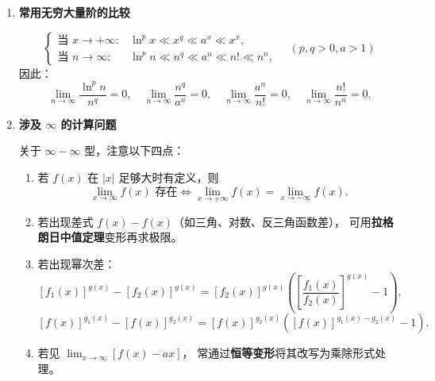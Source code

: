 \begin{enumerate}
\begin{enumerate}
              \item \textbf{带头大哥型：}

                    若 $\alpha=o(\beta)$，则
                    \[
                        \textcircled{1}\ \alpha+\beta\sim\beta, \qquad
                        \textcircled{2}\ \alpha+\beta\text{ 与 }\beta\text{同号}, \qquad
                        \textcircled{3}\ \alpha\beta=o(\beta^2).
                    \]
          \end{enumerate}

    \item \textbf{常用无穷大量阶的比较}

          \[
              \begin{cases}
                  \text{当 }x\to+\infty: & \ln^p x \ll x^q \ll a^x \ll x^x,        \\[4pt]
                  \text{当 }n\to\infty:  & \ln^p n \ll n^q \ll a^n \ll n! \ll n^n,
              \end{cases}\quad (p,q>0,a>1)
          \]
          因此：
          \[
              \lim_{n\to\infty}\frac{\ln^p n}{n^q}=0,\quad
              \lim_{n\to\infty}\frac{n^q}{a^n}=0,\quad
              \lim_{n\to\infty}\frac{a^n}{n!}=0,\quad
              \lim_{n\to\infty}\frac{n!}{n^n}=0.
          \]

    \item \textbf{涉及 $\infty$ 的计算问题} \DTwoThree

          关于 $\infty-\infty$ 型，注意以下四点：

          \begin{enumerate}
              \item 若 $f(x)$ 在 $|x|$ 足够大时有定义，则
                    \[
                        \lim_{x\to\infty}f(x) \text{ 存在}
                        \iff
                        \lim_{x\to+\infty}f(x) = \lim_{x\to-\infty}f(x).
                    \]

              \item 若出现差式 $f(x)-f(x)$（如三角、对数、反三角函数差），
                    可用\textbf{拉格朗日中值定理}变形再求极限。

              \item 若出现幂次差：
                    \[
                        [f_1(x)]^{g(x)}-[f_2(x)]^{g(x)} = [f_2(x)]^{g(x)}
                        \left(\left[\frac{f_1(x)}{f_2(x)}\right]^{g(x)}-1\right),
                    \]
                    \[
                        [f(x)]^{g_1(x)}-[f(x)]^{g_2(x)} = [f(x)]^{g_2(x)}
                        \left([f(x)]^{g_1(x)-g_2(x)}-1\right).
                    \]

              \item 若见 $\lim_{x\to\infty}[f(x)-ax]$，
                    常通过\textbf{恒等变形}将其改写为乘除形式处理。
          \end{enumerate}
\end{enumerate}

